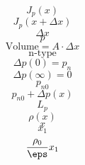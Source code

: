 \documentclass[letterpaper 12pt]{book}
\begin{document}
\[ J_p(x) \]
\[ J_p(x + \Delta x) \]
\[ \Delta x \]
\[ p \]
\[ \text{Volume} = A \cdot \Delta x \]
\[ \text{n-type} \]
\[ \Delta p (0) = p_n \]
\[ \Delta p (\infty) = 0 \]
\[ p_{n0} \]
\[ p_{n0} + \Delta p(x) \]
\[ L_p \]
\[ \rho(x) \]
\[ x \]
\[ x_1 \]
\[ \frac{\rho_0}{\eps} x_1 \]
\end{document}
